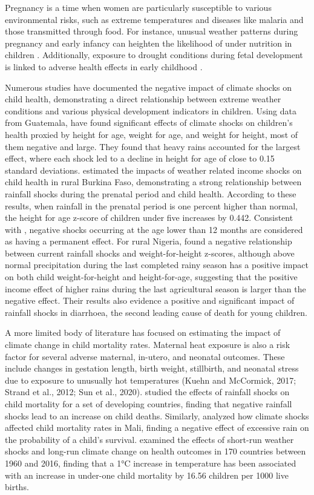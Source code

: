 \documentclass[a4paper]{article}
\begin{document}
Pregnancy is a time when women are particularly susceptible to various environmental risks, such as extreme temperatures \cite{strand2012} and diseases like malaria and those transmitted through food. For instance, unusual weather patterns during pregnancy and early infancy can heighten the likelihood of under nutrition in children \cite{dimitrova2020}. Additionally, exposure to drought conditions during fetal development is linked to adverse health effects in early childhood \cite{nguyen2022}.


Numerous studies have documented the negative impact of climate shocks on child health, demonstrating a direct relationship between extreme weather conditions and various physical development indicators in children. Using data from Guatemala, \cite{portner2010} have found significant effects of climate shocks on children's health proxied by height for age, weight for age, and weight for height, most of them negative and large. They found that heavy rains accounted for the largest effect, where each shock led to a decline in height for age of close to 0.15 standard deviations. \cite{borjean2012} estimated the impacts of weather related income shocks on child health in rural Burkina Faso, demonstrating a strong relationship between rainfall shocks during the prenatal period and child health. According to these results, when rainfall in the prenatal period is one percent higher than normal, the height for age z-score of children under five increases by 0.442. Consistent with \cite{akresh2012}, negative shocks occurring at the age lower than 12 months are considered as having a permanent effect. For rural Nigeria, \cite{rabassa2014} found a negative relationship between current rainfall shocks and weight-for-height z-scores, although above normal precipitation during the last completed rainy season has a positive impact on both child weight-for-height and height-for-age, suggesting that the positive income effect of higher rains during the last agricultural season is larger than the negative effect. Their results also evidence a positive and significant impact of rainfall shocks in diarrhoea, the second leading cause of death for young children.

A more limited body of literature has focused on estimating the impact of climate change in child mortality rates. Maternal heat exposure is also a risk factor for several adverse maternal, in-utero, and neonatal outcomes. These include changes in gestation length, birth weight, stillbirth, and neonatal stress due to exposure to unusually hot temperatures (Kuehn and McCormick, 2017; Strand et al., 2012; Sun et al., 2020).  \cite{ponnusamy2022} studied the effects of rainfall shocks on child mortality for a set of developing countries, finding that negative rainfall shocks lead to an increase on child deaths. Similarly, \cite{han2013} analyzed how climate shocks affected child mortality rates in Mali, finding a negative effect of excessive rain on the probability of a child's survival. \cite{meierrieks2021} examined the effects of short-run weather shocks and long-run climate change on health outcomes in 170 countries between 1960 and 2016, finding that a 1°C increase in temperature has been associated with an increase in under-one child mortality by 16.56 children per 1000 live births.
\end{document}
